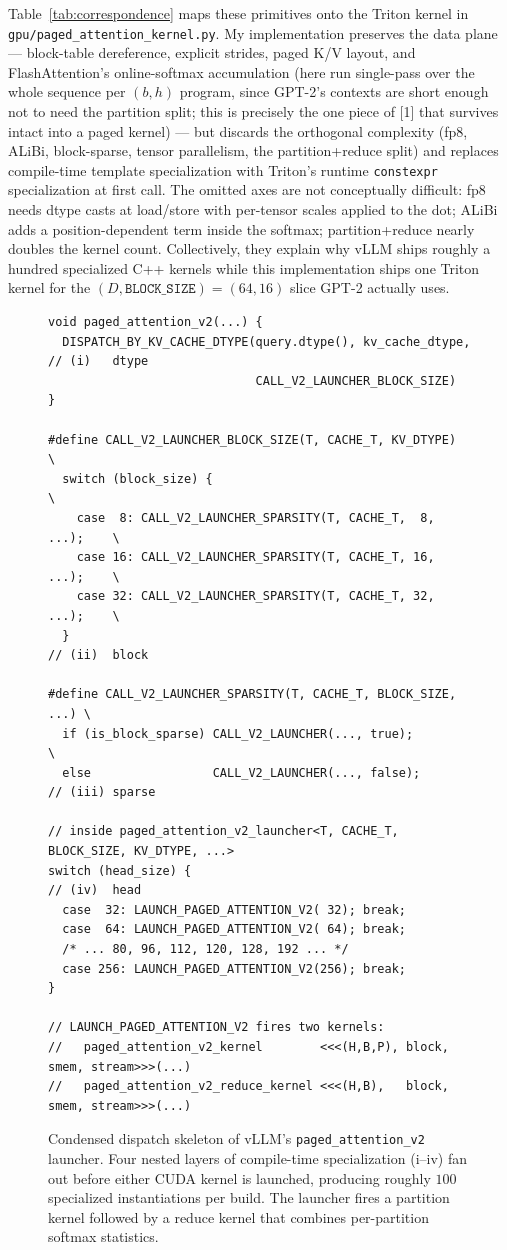 \documentclass{article}
\begin{document}
Table~\ref{tab:correspondence} maps these primitives onto the Triton kernel in \texttt{gpu/paged\_attention\_kernel.py}. My implementation preserves the data plane --- block-table dereference, explicit strides, paged K/V layout, and FlashAttention's online-softmax accumulation (here run single-pass over the whole sequence per $(b, h)$ program, since GPT-2's contexts are short enough not to need the partition split; this is precisely the one piece of [1] that survives intact into a paged kernel) --- but discards the orthogonal complexity (fp8, ALiBi, block-sparse, tensor parallelism, the partition+reduce split) and replaces compile-time template specialization with Triton's runtime \texttt{constexpr} specialization at first call. The omitted axes are not conceptually difficult: fp8 needs dtype casts at load/store with per-tensor scales applied to the dot; ALiBi adds a position-dependent term inside the softmax; partition+reduce nearly doubles the kernel count. Collectively, they explain why vLLM ships roughly a hundred specialized C++ kernels while this implementation ships one Triton kernel for the $(D, \texttt{BLOCK\_SIZE}) = (64, 16)$ slice GPT-2 actually uses.

\begin{figure}[t]
\begin{verbatim}
void paged_attention_v2(...) {
  DISPATCH_BY_KV_CACHE_DTYPE(query.dtype(), kv_cache_dtype,    // (i)   dtype
                             CALL_V2_LAUNCHER_BLOCK_SIZE)
}

#define CALL_V2_LAUNCHER_BLOCK_SIZE(T, CACHE_T, KV_DTYPE)      \
  switch (block_size) {                                         \
    case  8: CALL_V2_LAUNCHER_SPARSITY(T, CACHE_T,  8, ...);    \
    case 16: CALL_V2_LAUNCHER_SPARSITY(T, CACHE_T, 16, ...);    \
    case 32: CALL_V2_LAUNCHER_SPARSITY(T, CACHE_T, 32, ...);    \
  }                                                            // (ii)  block

#define CALL_V2_LAUNCHER_SPARSITY(T, CACHE_T, BLOCK_SIZE, ...) \
  if (is_block_sparse) CALL_V2_LAUNCHER(..., true);             \
  else                 CALL_V2_LAUNCHER(..., false);           // (iii) sparse

// inside paged_attention_v2_launcher<T, CACHE_T, BLOCK_SIZE, KV_DTYPE, ...>
switch (head_size) {                                            // (iv)  head
  case  32: LAUNCH_PAGED_ATTENTION_V2( 32); break;
  case  64: LAUNCH_PAGED_ATTENTION_V2( 64); break;
  /* ... 80, 96, 112, 120, 128, 192 ... */
  case 256: LAUNCH_PAGED_ATTENTION_V2(256); break;
}

// LAUNCH_PAGED_ATTENTION_V2 fires two kernels:
//   paged_attention_v2_kernel        <<<(H,B,P), block, smem, stream>>>(...)
//   paged_attention_v2_reduce_kernel <<<(H,B),   block, smem, stream>>>(...)
\end{verbatim}
\caption{Condensed dispatch skeleton of vLLM's \texttt{paged\_attention\_v2} launcher. Four nested layers of compile-time specialization (i--iv) fan out before either CUDA kernel is launched, producing roughly $100$ specialized instantiations per build. The launcher fires a partition kernel followed by a reduce kernel that combines per-partition softmax statistics.}
\label{lst:launcher}
\end{figure}
\end{document}
